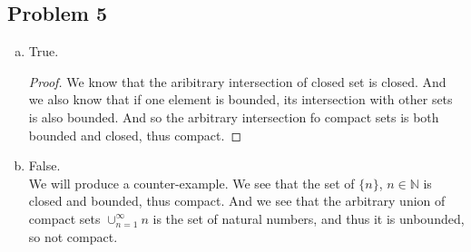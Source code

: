 \documentclass[12pt]{article}
\begin{document}
\subsection*{Problem 5}
\begin{enumerate}[a).]
    \item {
        True.
        \begin{proof}
            We know that the aribitrary intersection of closed set is closed. 
            And we also know that if one element is bounded, its intersection with other sets is also bounded. 
            And so the arbitrary intersection fo compact sets is both bounded and closed, thus compact.
        \end{proof}
    }
    \item {
        False. \\

        We will produce a counter-example. 
        We see that the set of $\{ n \}$, $n \in \mathbb{N}$ is closed and bounded, thus compact. 
        And we see that the arbitrary union of compact sets $\cup_{n=1}^{\infty}{n}$ is the set of natural numbers, and thus it is unbounded, so not compact.
    }
\end{enumerate}
\end{document}
